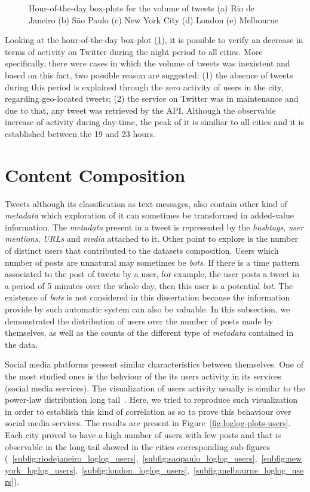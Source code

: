 \begin{figure}[htbp]
	\caption[Hour-of-the-day box-plots for the volume of tweets]{Hour-of-the-day box-plots for the volume of tweets (a) Rio de Janeiro (b) São Paulo (c) New York City (d) London (e) Melbourne}
	\label{fig:box_plots_hour_of_day}
\end{figure}

Looking at the hour-of-the-day box-plot (\ref{fig:box_plots_hour_of_day}), it is possible to verify an decrease in terms of activity on Twitter during the night period to all cities. More specifically, there were cases in which the volume of tweets was inexistent and based on this fact, two possible reason are suggested: (1) the absence of tweets during this period is explained through the zero activity of users in the city, regarding geo-located tweets; (2) the service on Twitter was in maintenance and due to that, any tweet was retrieved by the API. Although the observable increase of activity during day-time, the peak of it is similiar to all cities and it is established between the 19 and 23 hours.

\section{Content Composition}

Tweets although its classification as text messages, also contain other kind of \textit{metadata} which exploration of it can sometimes be transformed in added-value information. The \textit{metadata} present in a tweet is represented by the \textit{hashtags}, \textit{user mentions}, \textit{URLs} and \textit{media} attached to it. Other point to explore is the number of distinct users that contributed to the datasets composition. Users which number of posts are unnatural may sometimes be \textit{bots}. If there is a time pattern associated to the post of tweets by a user, for example, the user posts a tweet in a period of 5 minutes over the whole day, then this user is a potential \textit{bot}. The existence of \textit{bots} is not considered in this dissertation because the information provide by such automatic system can also be valuable. In this subsection, we demonstrated the distribution of users over the number of posts made by themselves, as well as the counts of the different type of \textit{metadata }contained in the data. 

Social media platforms present similar characteristics between themselves. One of the most studied ones is the behviour of the its users activity in its services (social media services). The visualization of users activity usually is similar to the power-law distribution long tail~\cite{muchnik2013origins}. Here, we tried to reproduce such visualization in order to establish this kind of correlation as so to prove this behaviour over social media services. The results are present in Figure~\ref{fig:loglog-plots-users}. Each city proved to have a high number of users with few posts and that is observable in the long-tail showed in the cities corresponding sub-figures (~\ref{subfig:riodejaneiro_loglog_users},~\ref{subfig:saopaulo_loglog_users},~\ref{subfig:newyork_loglog_users},~\ref{subfig:london_loglog_users},~\ref{subfig:melbourne_loglog_users}).

